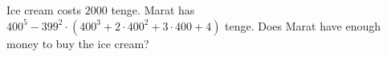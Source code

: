 Ice cream costs $2000$ tenge. Marat has $400^{5}-399^{2}\cdot(400^{3}+2\cdot400^{2}+3\cdot 400+4)$ tenge. Does Marat have enough money to buy the ice cream?
